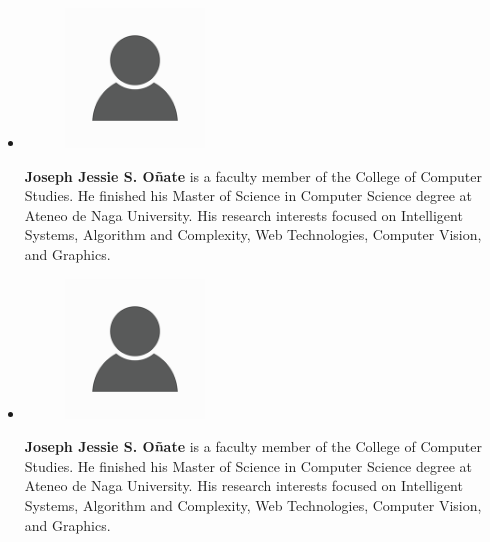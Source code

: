 
\begin{vita}

\begin{itemize}
    \item 
    
    \begin{figure}[ht]
        \centering
    	\includegraphics[width=0.35\textwidth]{figures/person-icon.png}
    \end{figure}
    
    \textbf{Joseph Jessie S. Oñate} is a faculty member of the College of Computer Studies. He finished his Master of Science in Computer Science degree at Ateneo de Naga University. His research interests focused on Intelligent Systems, Algorithm and Complexity, Web Technologies, Computer Vision, and Graphics.
    
    \item 
    
    \begin{figure}[ht]
        \centering
    	\includegraphics[width=0.35\textwidth]{figures/person-icon.png}
    \end{figure}
    
    \textbf{Joseph Jessie S. Oñate} is a faculty member of the College of Computer Studies. He finished his Master of Science in Computer Science degree at Ateneo de Naga University. His research interests focused on Intelligent Systems, Algorithm and Complexity, Web Technologies, Computer Vision, and Graphics.
    

\end{itemize}
\end{vita}
